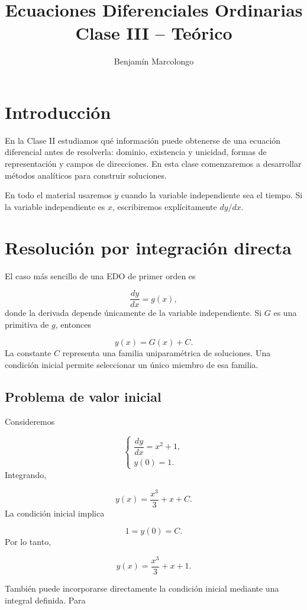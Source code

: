 \documentclass[12pt,a4paper]{article}
\title{Ecuaciones Diferenciales Ordinarias\\Clase III -- Teórico}
\author{Benjamín Marcolongo}
\date{}
\begin{document}
	\maketitle

	\section*{Introducción}

	En la Clase II estudiamos qué información puede obtenerse de una ecuación diferencial antes de resolverla: dominio, existencia y unicidad, formas de representación y campos de direcciones. En esta clase comenzaremos a desarrollar métodos analíticos para construir soluciones.

	En todo el material usaremos \(\dot y\) cuando la variable independiente sea el tiempo. Si la variable independiente es \(x\), escribiremos explícitamente \(dy/dx\).

	\clearpage
	\section{Resolución por integración directa}

	El caso más sencillo de una EDO de primer orden es

	\[
	\frac{dy}{dx}=g(x),
	\]
	donde la derivada depende únicamente de la variable independiente. Si \(G\) es una primitiva de \(g\), entonces

	\[
	y(x)=G(x)+C.
	\]
	La constante \(C\) representa una familia uniparamétrica de soluciones. Una condición inicial permite seleccionar un único miembro de esa familia.

	\subsection{Problema de valor inicial}

	Consideremos

	\[
	\begin{cases}
	\dfrac{dy}{dx}=x^2+1,\\[2mm]
	y(0)=1.
	\end{cases}
	\]
	Integrando,

	\[
	y(x)=\frac{x^3}{3}+x+C.
	\]
	La condición inicial implica

	\[
	1=y(0)=C.
	\]
	Por lo tanto,

	\[
	\boxed{y(x)=\frac{x^3}{3}+x+1.}
	\]

	También puede incorporarse directamente la condición inicial mediante una integral definida. Para
\end{document}

